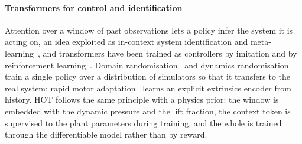 \paragraph{Transformers for control and identification} Attention over a window of past observations lets a policy infer the system it is acting on, an idea exploited as in-context system identification and meta-learning~\cite{Chen2021DT,Lee2023}, and transformers have been trained as controllers by imitation and by reinforcement learning~\cite{Chen2021DT,Janner2021}. Domain randomisation~\cite{Tobin2017} and dynamics randomisation~\cite{Peng2018} train a single policy over a distribution of simulators so that it transfers to the real system; rapid motor adaptation~\cite{Kumar2021} learns an explicit extrinsics encoder from history. HOT follows the same principle with a physics prior: the window is embedded with the dynamic pressure and the lift fraction, the context token is supervised to the plant parameters during training, and the whole is trained through the differentiable model rather than by reward.
